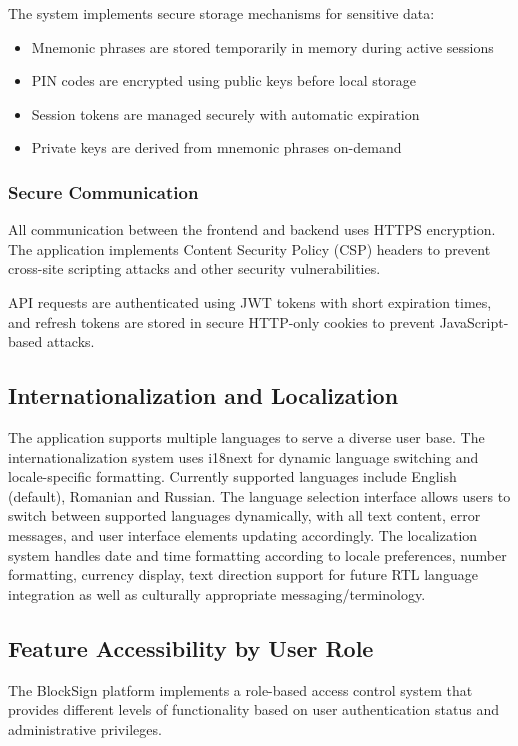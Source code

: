 The system implements secure storage mechanisms for sensitive data:
\begin{itemize}
    \item Mnemonic phrases are stored temporarily in memory during active sessions
    \item PIN codes are encrypted using public keys before local storage
    \item Session tokens are managed securely with automatic expiration
    \item Private keys are derived from mnemonic phrases on-demand
\end{itemize}

\subsubsection{Secure Communication}
All communication between the frontend and backend uses HTTPS encryption. The application implements Content Security Policy (CSP) headers to prevent cross-site scripting attacks and other security vulnerabilities.

API requests are authenticated using JWT tokens with short expiration times, and refresh tokens are stored in secure HTTP-only cookies to prevent JavaScript-based attacks.

\subsection{Internationalization and Localization}
The application supports multiple languages to serve a diverse user base. The internationalization system uses i18next for dynamic language switching and locale-specific formatting. Currently supported languages include English (default), Romanian and Russian. The language selection interface allows users to switch between supported languages dynamically, with all text content, error messages, and user interface elements updating accordingly. The localization system handles date and time formatting according to locale preferences, number formatting, currency display, text direction support for future RTL language integration as well as culturally appropriate messaging/terminology.

\subsection{Feature Accessibility by User Role}
The BlockSign platform implements a role-based access control system that provides different levels of functionality based on user authentication status and administrative privileges.

